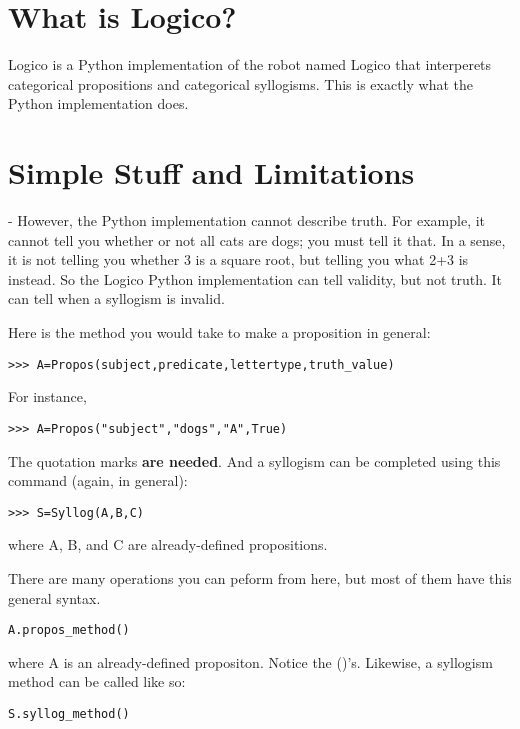 \documentclass[8pt]{extarticle} %
\begin{document}
 
\section{What is Logico?}

Logico is a Python implementation of the robot named Logico that interperets categorical propositions      and categorical syllogisms. This is exactly what the Python implementation does.

\section{Simple Stuff and Limitations}
-
However, the Python implementation cannot describe truth. For example, it cannot tell you whether or not all cats are dogs; you must tell it that. In a sense, it is not telling you whether 3 is a square root, but telling you what 2+3 is instead. So the Logico Python implementation can tell validity, but not truth. It can tell when a syllogism is invalid.

Here is the method you would take to make a proposition in general:

\begin{verbatim}
>>> A=Propos(subject,predicate,lettertype,truth_value)
\end{verbatim}

For instance,

\begin{verbatim}
>>> A=Propos("subject","dogs","A",True)
\end{verbatim}

The quotation marks {\bf{are needed}}. And a syllogism can be completed using this command (again, in general):

\begin{verbatim}
>>> S=Syllog(A,B,C)
\end{verbatim}  

where A, B, and C are already-defined propositions.

There are many operations you can peform from here, but most of them have this general syntax.

\begin{verbatim}
A.propos_method()
\end{verbatim}
where A is an already-defined propositon. Notice the ()'s. Likewise, a syllogism method can be called like so:

\begin{verbatim}
S.syllog_method()
\end{verbatim}
\end{document}
